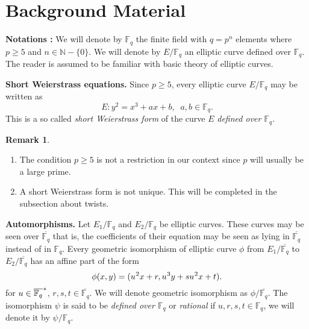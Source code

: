 \documentclass[10pt]{article}
\theoremstyle{definition}
\newtheorem{remark}{Remark}
\newcommand{\N}{\mathbb{N}}
\newcommand{\F}{\mathbb{F}}
\begin{document}
\section{Background Material}

\textbf{Notations :}
We will denote by $\F_q$ the finite field with $q = p^n$ elements where $p \geq 5$ and $n \in \N - \lbrace 0 \rbrace$.
We will denote by $E/\F_q$ an elliptic curve defined over $\F_q$. 
The reader is assumed to be familiar with basic theory of elliptic curves.

\vspace*{.5cm}

\noindent \textbf{Short Weierstrass equations.}  Since $p\geq 5$, every elliptic curve $E/\F_q$ may be written as
\[ E : y^2 = x^3 + ax + b, \; \; a,b \in \F_q. \]
This is a so called \textsl{short Weierstrass form} of the curve $E$ \textsl{defined over $\F_q$}.

\vspace*{.5cm}

\noindent \begin{remark} 
\begin{enumerate}
\item The condition $p \geq 5$ is not a restriction in our context since $p$ will usually be a large prime.
\item A short Weierstrass form is not unique.
This will be completed in the subsection about twists.

\end{enumerate}
\end{remark}

\noindent \textbf{Automorphisms.} Let $E_1/\F_q$ and $E_2/\F_q$ be elliptic curves. 
These curves may be seen over $\overline{\F_q}$ that is, the coefficients of their equation may be seen as lying in $\overline{\F_q}$ instead of in $\F_q$.
Every geometric isomorphism of elliptic curve $\phi$ from $E_1/\overline{\F_q}$ to $E_2/\overline{\F_q}$ has an  affine part of the form 
\begin{equation}\label{morphism}
 \phi(x,y) = (u^{\mkern1mu 2}x + r, u^{\mkern1mu 3}y + su^{\mkern1mu 2}x + t).
\end{equation}
for $u \in \overline{\F_q}^{\mkern1mu *}$, $r,s,t \in \overline{\F_q}$.
We will denote geometric isomorphism as $\phi/\overline{\F_q}$.
The isomorphism $\psi$ is said to be \textsl{defined over $\F_q$} or \textsl{rational} if $u,r,s,t \in \F_q$, we will denote it by $\psi/\F_q$.
\end{document}

